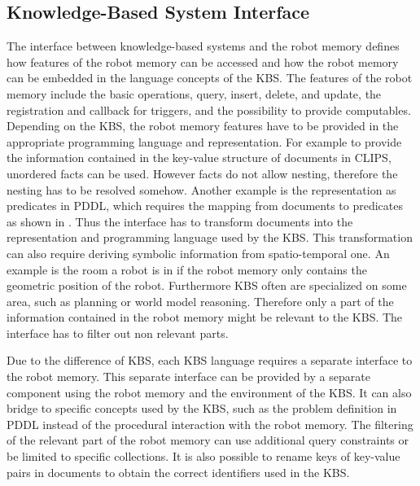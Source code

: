 \subsection{Knowledge-Based System Interface}
\label{sec:kbs-interface}
The interface between knowledge-based systems and the robot memory
defines how features of the robot memory can be accessed and how the
robot memory can be embedded in the language concepts of the KBS. The
features of the robot memory include the basic operations, query,
insert, delete, and update, the registration and callback for
triggers, and the possibility to provide computables.  Depending on
the KBS, the robot memory features have to be provided in the
appropriate programming language and representation. For example to
provide the information contained in the key-value structure of
documents in CLIPS, unordered facts can be used. However facts do not
allow nesting, therefore the nesting has to be resolved
somehow. Another example is the representation as predicates in PDDL,
which requires the mapping from documents to predicates as shown in
. Thus the interface has to transform documents
into the representation and programming language used by the KBS. This
transformation can also require deriving symbolic information from
spatio-temporal one. An example is the room a robot is in if the robot
memory only contains the geometric position of the robot. Furthermore KBS
often are specialized on some area, such as planning or world model
reasoning. Therefore only a part of the information contained in the
robot memory might be relevant to the KBS. The interface has to filter
out non relevant parts.

Due to the difference of KBS, each KBS language requires a separate
interface to the robot memory. This separate interface can be provided
by a separate component using the robot memory and the environment of
the KBS. It can also bridge to specific concepts used by the KBS, such
as the problem definition in PDDL instead of the procedural
interaction with the robot memory. The filtering of the relevant part
of the robot memory can use additional query constraints or be limited
to specific collections. It is also possible to rename keys of
key-value pairs in documents to obtain the correct identifiers used in
the KBS.

